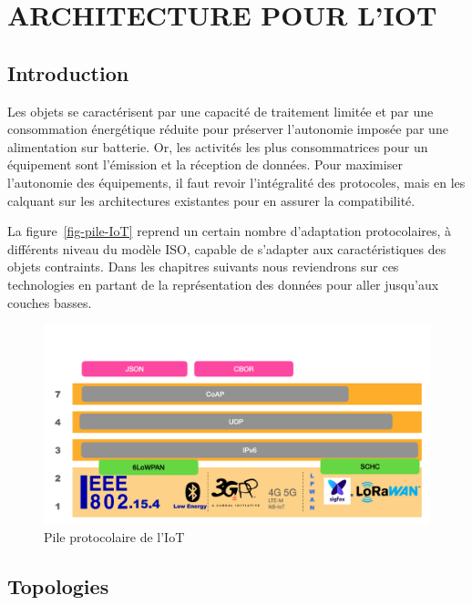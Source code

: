 \chapter{ARCHITECTURE POUR L'IOT}

\section{Introduction}
  
    \vspace{1em}
   

Les objets se caractérisent 
par 
une capacité
de traitement limitée et par une consommation énergétique réduite pour préserver l’autonomie imposée par une alimentation sur batterie.
Or, les activités les plus consommatrices pour un équipement sont l’émission et la réception de données. 
Pour maximiser l’autonomie des équipements, il faut revoir l’intégralité des protocoles, mais en les calquant sur les architectures existantes pour en assurer la compatibilité. 

La figure~\vref{fig-pile-IoT} reprend un certain nombre d'adaptation protocolaires, à différents niveau du modèle \ac{ISO}, capable de s'adapter aux caractéristiques des objets contraints. Dans les chapitres suivants nous reviendrons sur ces technologies en partant de la représentation des données pour aller jusqu'aux couches basses.

\begin{figure}[tbp]
\centerline{\includegraphics[width=1\columnwidth]{Pictures/Capture17.png}}
\caption{Pile protocolaire de l'IoT}
\label{fig-pile-IoT}
\end{figure}

\section{Topologies}

